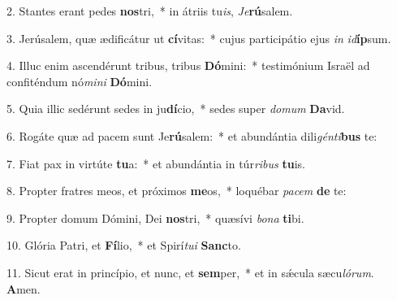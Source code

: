 2. Stantes erant pedes \textbf{nos}tri,~*  in átriis tu\textit{is}, \textit{Je}\textbf{rú}salem.\

3. Jerúsalem, quæ ædificátur ut \textbf{cí}vitas:~*  cujus participátio ejus \textit{in} \textit{id}\textbf{íp}sum.\

4. Illuc enim ascendérunt tribus, tribus \textbf{Dó}mini:~*  testimónium Israël ad confiténdum nó\textit{mi}\textit{ni} \textbf{Dó}mini.\

5. Quia illic sedérunt sedes in ju\textbf{dí}cio,~*  sedes super \textit{do}\textit{mum} \textbf{Da}vid.\

6. Rogáte quæ ad pacem sunt Je\textbf{rú}salem:~*  et abundántia dili\textit{gén}\textit{ti}\textbf{bus} te:\

7. Fiat pax in virtúte \textbf{tu}a:~*  et abundántia in túr\textit{ri}\textit{bus} \textbf{tu}is.\

8. Propter fratres meos, et próximos \textbf{me}os,~*  loquébar \textit{pa}\textit{cem} \textbf{de} te:\

9. Propter domum Dómini, Dei \textbf{nos}tri,~*  quæsívi \textit{bo}\textit{na} \textbf{ti}bi.\

10. Glória Patri, et \textbf{Fí}lio,~*  et Spirí\textit{tu}\textit{i} \textbf{Sanc}to.\

11. Sicut erat in princípio, et nunc, et \textbf{sem}per,~*  et in sǽcula sæcu\textit{ló}\textit{rum}. \textbf{A}men.\

